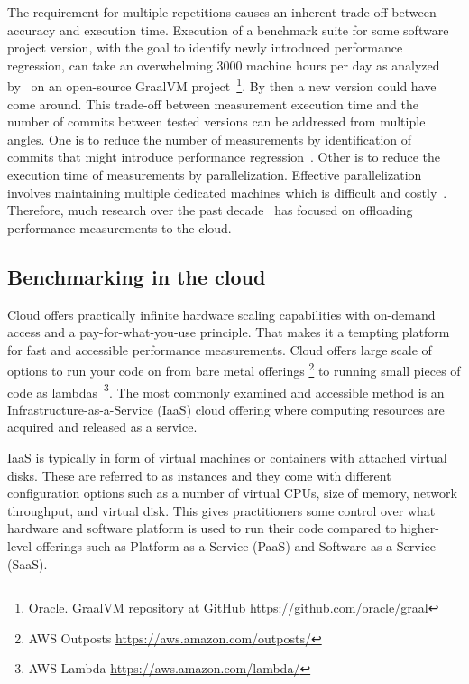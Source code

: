 The requirement for multiple repetitions causes an inherent trade-off between accuracy and execution time.
Execution of a benchmark suite for some software project version, with the goal to identify newly introduced performance regression, can take an overwhelming 3000 machine hours per day as analyzed by~\citet{bulej2020duet} on an open-source GraalVM project~\footnote{Oracle. GraalVM repository at GitHub \url{https://github.com/oracle/graal}}.
By then a new version could have come around.
This trade-off between measurement execution time and the number of commits between tested versions can be addressed from multiple angles.
One is to reduce the number of measurements by identification of commits that might introduce performance regression~\citet{oliveira2017perphecy}.
Other is to reduce the execution time of measurements by parallelization.
Effective parallelization involves maintaining multiple dedicated machines which is difficult and costly~.
Therefore, much research over the past decade~\cite{leitner2016patterns, laaber2019software, abedi2017conducting} has focused on offloading performance measurements to the cloud.

\subsection{Benchmarking in the cloud}
Cloud offers practically infinite hardware scaling capabilities with on-demand access and a pay-for-what-you-use principle.
That makes it a tempting platform for fast and accessible performance measurements.
Cloud offers large scale of options to run your code on from bare metal offerings \footnote{AWS Outposts \url{https://aws.amazon.com/outposts/}} to running small pieces of code as lambdas~\footnote{AWS Lambda \url{https://aws.amazon.com/lambda/}}.
The most commonly examined and accessible method is an Infrastructure-as-a-Service (IaaS) cloud offering where computing resources are acquired and released as a service.

IaaS is typically in form of virtual machines or containers with attached virtual disks.
These are referred to as instances and they come with different configuration options such as a number of virtual CPUs, size of memory, network throughput, and virtual disk.
This gives practitioners some control over what hardware and software platform is used to run their code compared to higher-level offerings such as Platform-as-a-Service (PaaS) and Software-as-a-Service (SaaS).

